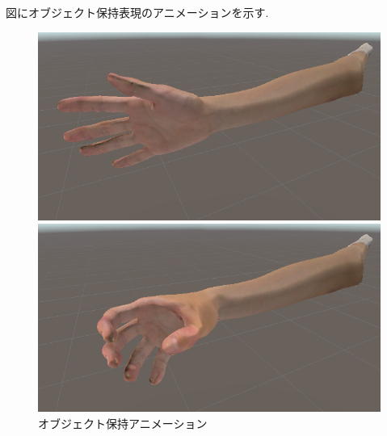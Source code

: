 \documentclass{ltjsreport}
\begin{document}
			図にオブジェクト保持表現のアニメーションを示す.
			\begin{figure}[H]
			\centering
			\begin{minipage}{0.45\columnwidth}
			\centering
			\includegraphics[width = \columnwidth]{../figs/nutralHand.png}
			\end{minipage}
			\hspace{0.04\columnwidth}
			\begin{minipage}{0.45\columnwidth}
			\centering
			\includegraphics[width = \columnwidth]{../figs/grapsphereHand.png}
			\end{minipage}
			\caption{オブジェクト保持アニメーション}
			\label{fig:ObjectHold}
			\end{figure}
\end{document}
